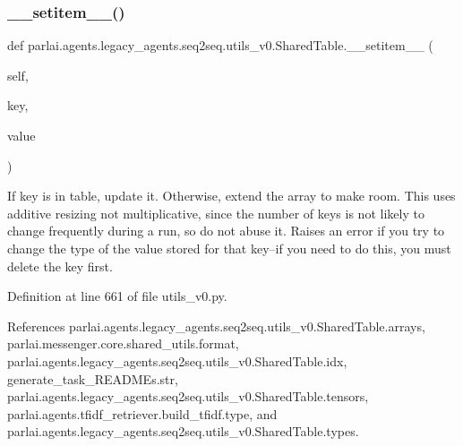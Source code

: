 \subsubsection{\texorpdfstring{\+\_\+\+\_\+setitem\+\_\+\+\_\+()}{\_\_setitem\_\_()}}
{\footnotesize\ttfamily def parlai.\+agents.\+legacy\+\_\+agents.\+seq2seq.\+utils\+\_\+v0.\+Shared\+Table.\+\_\+\+\_\+setitem\+\_\+\+\_\+ (\begin{DoxyParamCaption}\item[{}]{self,  }\item[{}]{key,  }\item[{}]{value }\end{DoxyParamCaption})}

\begin{DoxyVerb}If key is in table, update it. Otherwise, extend the array to make
room. This uses additive resizing not multiplicative, since the number
of keys is not likely to change frequently during a run, so do not abuse
it.
Raises an error if you try to change the type of the value stored for
that key--if you need to do this, you must delete the key first.
\end{DoxyVerb}
 

Definition at line 661 of file utils\+\_\+v0.\+py.



References parlai.\+agents.\+legacy\+\_\+agents.\+seq2seq.\+utils\+\_\+v0.\+Shared\+Table.\+arrays, parlai.\+messenger.\+core.\+shared\+\_\+utils.\+format, parlai.\+agents.\+legacy\+\_\+agents.\+seq2seq.\+utils\+\_\+v0.\+Shared\+Table.\+idx, generate\+\_\+task\+\_\+\+R\+E\+A\+D\+M\+Es.\+str, parlai.\+agents.\+legacy\+\_\+agents.\+seq2seq.\+utils\+\_\+v0.\+Shared\+Table.\+tensors, parlai.\+agents.\+tfidf\+\_\+retriever.\+build\+\_\+tfidf.\+type, and parlai.\+agents.\+legacy\+\_\+agents.\+seq2seq.\+utils\+\_\+v0.\+Shared\+Table.\+types.

\mbox{\label{classparlai_1_1agents_1_1legacy__agents_1_1seq2seq_1_1utils__v0_1_1SharedTable_a678937ad3dcc29e6bda6898c6462950f}} 
